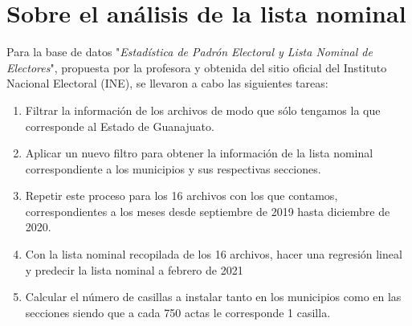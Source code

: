 \documentclass[12pt,letterpaper]{article}
\begin{document}
\section{Sobre el análisis de la lista nominal}
Para la base de datos "\textit{Estadística de Padrón Electoral y Lista Nominal de Electores}", propuesta por la profesora y obtenida del sitio oficial del Instituto Nacional Electoral (INE)\cite{INE}, se llevaron a cabo las siguientes tareas:

\begin{enumerate}
    \item Filtrar la información de los archivos de modo que sólo tengamos la que corresponde al Estado de Guanajuato. 
    \item Aplicar un nuevo filtro para obtener la información de la lista nominal correspondiente a los municipios y sus respectivas secciones. 
    \item Repetir este proceso para los 16 archivos con los que contamos, correspondientes a los meses desde septiembre de 2019 hasta diciembre de 2020. 
    \item Con la lista nominal recopilada de los 16 archivos, hacer una regresión lineal y predecir la lista nominal a febrero de 2021
    \item Calcular el número de casillas a instalar tanto en los municipios como en las secciones siendo que a cada 750 actas le corresponde 1 casilla. 
\end{enumerate}
\end{document}
